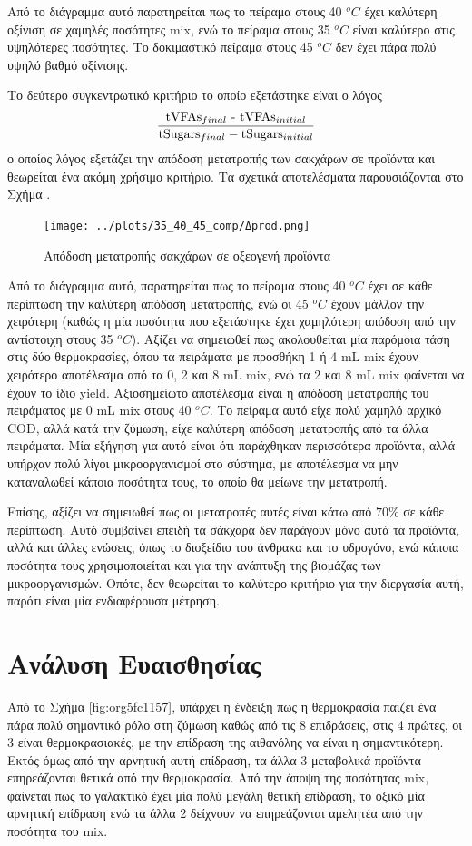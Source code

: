 \documentclass[11pt]{report}
\begin{document}
Από το διάγραμμα αυτό παρατηρείται πως το πείραμα στους 40 \(^oC\) έχει καλύτερη οξίνιση σε χαμηλές ποσότητες \acrshort{mix}, ενώ το πείραμα στους 35 \(^oC\) είναι καλύτερο στις υψηλότερες ποσότητες. Το δοκιμαστικό πείραμα στους 45 \(^oC\) δεν έχει πάρα πολύ υψηλό βαθμό οξίνισης.

Το δεύτερο συγκεντρωτικό κριτήριο το οποίο εξετάστηκε είναι ο λόγος \[ \frac{\text{tVFAs$_{final}$ - \text{tVFAs$_{initial}$}}}{\text{tSugars$_{final}$} -  \text{tSugars$_{initial}$}} \] ο οποίος λόγος εξετάζει την απόδοση μετατροπής των σακχάρων σε προϊόντα και θεωρείται ένα ακόμη χρήσιμο κριτήριο. Τα σχετικά αποτελέσματα παρουσιάζονται στο Σχήμα .

\begin{figure}[htbp]
\centering
\texttt{[image: ../plots/35\_40\_45\_comp/Δprod.png]}
\caption{Απόδοση μετατροπής σακχάρων σε οξεογενή προϊόντα}
\end{figure}

Από το διάγραμμα αυτό, παρατηρείται πως το πείραμα στους 40 \(^oC\) έχει σε κάθε περίπτωση την καλύτερη απόδοση μετατροπής, ενώ οι 45 \(^oC\) έχουν μάλλον την χειρότερη (καθώς η μία ποσότητα που εξετάστηκε έχει χαμηλότερη απόδοση από την αντίστοιχη στους 35 \(^oC\)). Αξίζει να σημειωθεί πως ακολουθείται μία παρόμοια τάση στις δύο θερμοκρασίες, όπου τα πειράματα με προσθήκη 1 ή 4 mL \acrshort{mix} έχουν χειρότερο αποτέλεσμα από τα 0, 2 και 8 mL \acrshort{mix}, ενώ τα 2 και 8 mL \acrshort{mix} φαίνεται να έχουν το ίδιο yield. Αξιοσημείωτο αποτέλεσμα είναι η απόδοση μετατροπής του πειράματος με 0 mL \acrshort{mix} στους 40 \(^oC\). Το πείραμα αυτό είχε πολύ χαμηλό αρχικό COD, αλλά κατά την ζύμωση, είχε καλύτερη απόδοση μετατροπής από τα άλλα πειράματα. Μία εξήγηση για αυτό είναι ότι παράχθηκαν περισσότερα προϊόντα, αλλά υπήρχαν πολύ λίγοι μικροοργανισμοί στο σύστημα, με αποτέλεσμα να μην καταναλωθεί κάποια ποσότητα τους, το οποίο θα μείωνε την μετατροπή.

Επίσης, αξίζει να σημειωθεί πως οι μετατροπές αυτές είναι κάτω από \(70 \%\) σε κάθε περίπτωση. Αυτό συμβαίνει επειδή τα σάκχαρα δεν παράγουν μόνο αυτά τα προϊόντα, αλλά και άλλες ενώσεις, όπως το διοξείδιο του άνθρακα και το υδρογόνο, ενώ κάποια ποσότητα τους χρησιμοποιείται και για την ανάπτυξη της βιομάζας των μικροοργανισμών. Οπότε, δεν θεωρείται το καλύτερο κριτήριο για την διεργασία αυτή, παρότι είναι μία ενδιαφέρουσα μέτρηση.

\section{Ανάλυση Ευαισθησίας}
\label{sec:org11d4b26}
Από το Σχήμα \ref{fig:org5fc1157}, υπάρχει η ένδειξη πως η θερμοκρασία παίζει ένα πάρα πολύ σημαντικό ρόλο στη ζύμωση καθώς από τις 8 επιδράσεις, στις 4 πρώτες, οι 3 είναι θερμοκρασιακές, με την επίδραση της αιθανόλης να είναι η σημαντικότερη. Εκτός όμως από την αρνητική αυτή επίδραση, τα άλλα 3 μεταβολικά προϊόντα επηρεάζονται θετικά από την θερμοκρασία. Από την άποψη της ποσότητας \acrshort{mix}, φαίνεται πως το γαλακτικό έχει μία πολύ μεγάλη θετική επίδραση, το οξικό μία αρνητική επίδραση ενώ τα άλλα 2 δείχνουν να επηρεάζονται αμελητέα από την ποσότητα του \acrshort{mix}.
\end{document}
